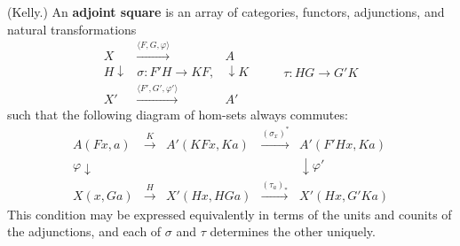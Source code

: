 (Kelly.) An \textbf{adjoint square} is an array of categories, functors, adjunctions, and natural transformations
\[
\begin{array}{ccc}
X & \xrightarrow{\langle F, G, \varphi \rangle} & A \\
H \downarrow & \sigma : F'H \to KF, & \downarrow K \\
X' & \xrightarrow{\langle F', G', \varphi' \rangle} & A'
\end{array}
\qquad
\begin{array}{c}
\tau : HG \to G'K
\end{array}
\]
such that the following diagram of hom-sets always commutes:
\[
\begin{array}{ccccc}
A(Fx, a) & \xrightarrow{K} & A'(KFx, Ka) & \xrightarrow{(\sigma_x)^*} & A'(F'Hx, Ka) \\
\varphi \downarrow & & & & \downarrow \varphi' \\
X(x, Ga) & \xrightarrow{H} & X'(Hx, HGa) & \xrightarrow{(\tau_a)_*} & X'(Hx, G'Ka)
\end{array}
\]
This condition may be expressed equivalently in terms of the units and counits of the adjunctions, and each of $\sigma$ and $\tau$ determines the other uniquely.
